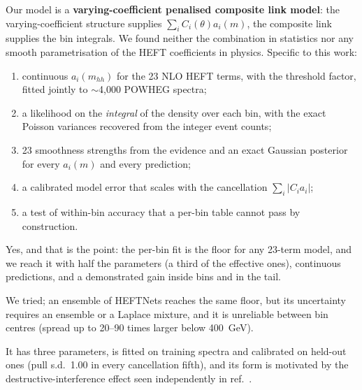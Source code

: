 \begin{keyidea}
Our model is a \textbf{varying-coefficient penalised composite link model}: the
varying-coefficient structure supplies $\sum_iC_i(\theta)a_i(m)$, the composite link supplies
the bin integrals. We found neither the combination in statistics nor any smooth
parametrisation of the HEFT coefficients in physics. Specific to this work:
\begin{enumerate}
  \item continuous $a_i(m_{hh})$ for the 23 NLO HEFT terms, with the threshold factor,
    fitted jointly to $\sim$4,000 POWHEG spectra;
  \item a likelihood on the \emph{integral} of the density over each bin, with the exact
    Poisson variances recovered from the integer event counts;
  \item 23 smoothness strengths from the evidence and an exact Gaussian posterior for every
    $a_i(m)$ and every prediction;
  \item a calibrated model error that scales with the cancellation $\sum_i|C_ia_i|$;
  \item a test of within-bin accuracy that a per-bin table cannot pass by construction.
\end{enumerate}
\end{keyidea}

\begin{watch}
\begin{description}[leftmargin=0pt,style=nextline]
  \item[``This is just the WG per-bin fit with smoothing.''] Yes, and that is the point:
    the per-bin fit is the floor for any 23-term model, and we reach it with half the parameters
    (a third of the effective ones), continuous predictions, and a demonstrated gain inside bins and in the tail.
  \item[``Why not a network?''] We tried; an ensemble of HEFTNets reaches the same floor,
    but its uncertainty requires an ensemble or a Laplace mixture, and it is unreliable
    between bin centres (spread up to 20--90 times larger below 400~GeV).
  \item[``The discrepancy term is ad hoc.''] It has three parameters, is fitted on training
    spectra and calibrated on held-out ones (pull s.d.\ 1.00 in every cancellation fifth),
    and its form is motivated by the destructive-interference effect seen independently in
    ref.~\cite{Cadamuro2025}.
\end{description}
\end{watch}

